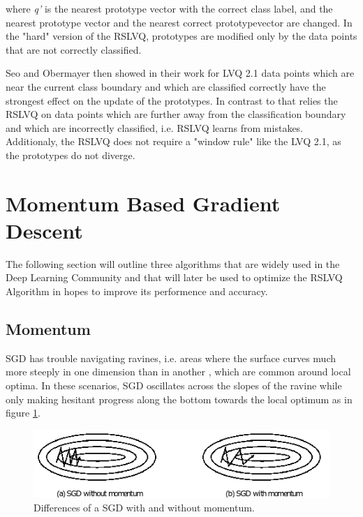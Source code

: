 \documentclass[12pt,oneside,a4paper,parskip]{scrbook}
\begin{document}
where \textit{q'} is the nearest prototype vector with the correct class label, and the nearest prototype vector and the 
nearest correct prototypevector are changed. In the "hard" version of the RSLVQ, prototypes are modified only by the data 
points that are not correctly classified. \cite{RSLVQOrig}

Seo and Obermayer then showed in their work \cite{RSLVQOrig} for LVQ 2.1 data points which are near the current 
class boundary and which are classified correctly have the strongest effect on the update of the prototypes. In contrast to that
relies the RSLVQ on data points which are further away from the classification boundary and which are incorrectly classified,
i.e. RSLVQ learns from mistakes. Additionaly, the RSLVQ does not require a "window rule" like the LVQ 2.1, as the prototypes 
do not diverge. \cite{RSLVQOrig}

\section{Momentum Based Gradient Descent}

The following section will outline three algorithms that are widely used in the Deep Learning Community and that will later
be used to optimize the RSLVQ Algorithm in hopes to improve its performence and accuracy.

\subsection{Momentum}

SGD has trouble navigating ravines, i.e. areas where the surface curves much more steeply in one dimension than in another \cite{problemSteepLearn, overvieDiffRSLVQ},
which are common around local optima. In these scenarios, SGD oscillates across the slopes of the ravine while only making 
hesitant progress along the bottom towards the local optimum as in figure \ref{fig:SGD_momentum}.

\begin{figure}[H]
  \centering
  \includegraphics[width=\columnwidth]{SGD_momentum}
  \caption[Diff. SGD moment.]{Differences of a SGD with and without momentum.\footnotemark} 
  \label{fig:SGD_momentum}
\end{figure}
\end{document}

